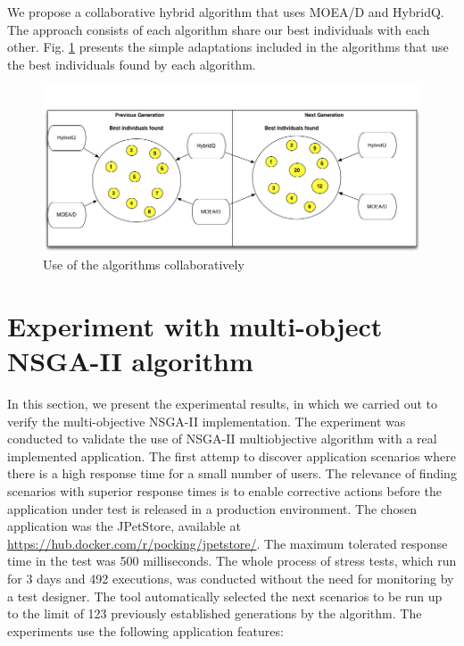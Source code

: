 \documentclass[espaco=umemeio,chapter=TITLE,twoside,openright]{abnt}
\begin{document}
We propose a collaborative hybrid algorithm that uses MOEA/D and HybridQ. The approach consists of each algorithm share our best individuals with each other. Fig. \ref{fig:co2} presents the simple adaptations included in the algorithms that use the best individuals found by each algorithm.

\begin{figure}[h]
\centering
\includegraphics[width=1\textwidth]{./images/collaborative2.png}
\caption{Use of the  algorithms collaboratively}
\label{fig:co2}
\end{figure}



\section{Experiment with multi-object NSGA-II algorithm}

In this section,  we present the experimental results,  in which we carried out to verify the multi-objective NSGA-II   implementation. The experiment was conducted to validate the use of NSGA-II multiobjective algorithm with a real implemented application. The first attemp to discover application scenarios where there is a high response time for a small number of users. The relevance of finding scenarios with superior response times is to enable corrective actions before the application under test is released in a production environment. The chosen application was the JPetStore, available at \url{https://hub.docker.com/r/pocking/jpetstore/}. The maximum tolerated response time in the test was 500 milliseconds.  The whole process of stress  tests, which run for 3 days and 492 executions,  was conducted without the need for monitoring by a test designer. The tool automatically selected the next scenarios to be run up to the limit of 123 previously established  generations by the algorithm. The experiments use the following application features:
\end{document}
